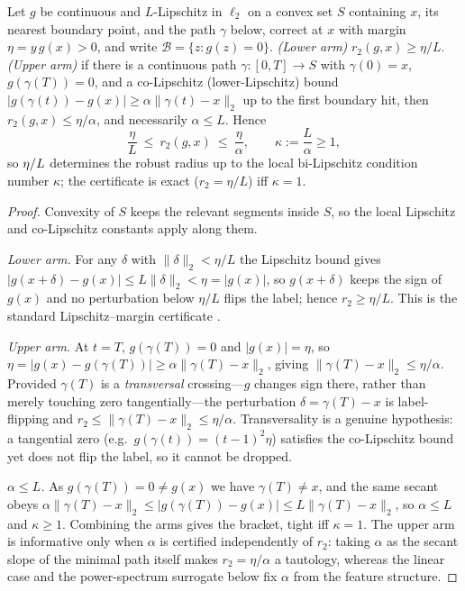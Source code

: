 \begin{proposition}\label{prop:sandwich}
Let $g$ be continuous and $L$-Lipschitz in $\ell_2$ on a convex set $S$
containing $x$, its nearest boundary point, and the path $\gamma$ below, correct
at $x$ with margin $\eta=y\,g(x)>0$, and write $\mathcal B=\{z:g(z)=0\}$.
\emph{(Lower arm)} $r_2(g,x)\ge\eta/L$. \emph{(Upper arm)} if there is a
continuous path $\gamma:[0,T]\to S$ with $\gamma(0)=x$, $g(\gamma(T))=0$, and a
co-Lipschitz (lower-Lipschitz) bound
$|g(\gamma(t))-g(x)|\ge\alpha\lVert\gamma(t)-x\rVert_2$ up to the first boundary
hit, then $r_2(g,x)\le\eta/\alpha$, and necessarily $\alpha\le L$. Hence
\[
\frac{\eta}{L}\ \le\ r_2(g,x)\ \le\ \frac{\eta}{\alpha},\qquad
\kappa:=\frac{L}{\alpha}\ge1,
\]
so $\eta/L$ determines the robust radius up to the local bi-Lipschitz condition
number $\kappa$; the certificate is exact ($r_2=\eta/L$) iff $\kappa=1$.
\end{proposition}
\begin{proof}
Convexity of $S$ keeps the relevant segments inside $S$, so the local Lipschitz
and co-Lipschitz constants apply along them.

\emph{Lower arm.} For any $\delta$ with $\lVert\delta\rVert_2<\eta/L$ the
Lipschitz bound gives $|g(x+\delta)-g(x)|\le L\lVert\delta\rVert_2<\eta=|g(x)|$,
so $g(x+\delta)$ keeps the sign of $g(x)$ and no perturbation below $\eta/L$
flips the label; hence $r_2\ge\eta/L$. This is the standard Lipschitz--margin
certificate \citep{hein2017formal,tsuzuku2018lipschitz}.

\emph{Upper arm.} At $t=T$, $g(\gamma(T))=0$ and $|g(x)|=\eta$, so
$\eta=|g(x)-g(\gamma(T))|\ge\alpha\lVert\gamma(T)-x\rVert_2$, giving
$\lVert\gamma(T)-x\rVert_2\le\eta/\alpha$. Provided $\gamma(T)$ is a \emph{transversal} crossing---$g$
changes sign there, rather than merely touching zero tangentially---the
perturbation $\delta=\gamma(T)-x$ is label-flipping and
$r_2\le\lVert\gamma(T)-x\rVert_2\le\eta/\alpha$. Transversality is a genuine
hypothesis: a tangential zero (e.g.\ $g(\gamma(t))=(t-1)^2\eta$) satisfies the
co-Lipschitz bound yet does not flip the label, so it cannot be dropped.

\emph{$\alpha\le L$.} As $g(\gamma(T))=0\neq g(x)$ we have $\gamma(T)\neq x$, and
the same secant obeys
$\alpha\lVert\gamma(T)-x\rVert_2\le|g(\gamma(T))-g(x)|\le L\lVert\gamma(T)-x\rVert_2$,
so $\alpha\le L$ and $\kappa\ge1$. Combining the arms gives the bracket, tight
iff $\kappa=1$. The upper arm is informative only when $\alpha$ is certified
independently of $r_2$: taking $\alpha$ as the secant slope of the minimal path
itself makes $r_2=\eta/\alpha$ a tautology, whereas the linear case and the
power-spectrum surrogate below fix $\alpha$ from the feature structure.
\end{proof}

